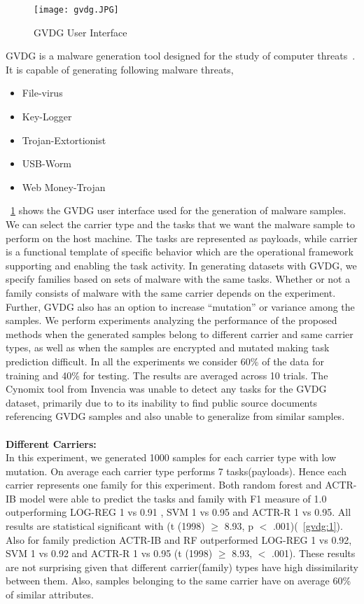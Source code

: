 \documentclass[conference]{IEEEtran}
\begin{document}
\begin{figure}[htb!]
	\centerline{\texttt{[image: gvdg.JPG]}}
	
	\caption{\textmd{GVDG User Interface}}
	
	\label{gvdg}
\end{figure}
\vspace{-2em}
GVDG is a malware generation tool designed for the study of computer threats~\cite{gvdg}. It is capable of generating following malware threats,
\begin{itemize}
	\setlength\itemsep{-0.1em}
	\item File-virus
	\item Key-Logger
	\item Trojan-Extortionist 
	\item USB-Worm
	\item Web Money-Trojan
\end{itemize}



\figurename~\ref{gvdg} shows the GVDG user interface used for the generation of malware samples. We can select the carrier type and the tasks that we want the malware sample to perform on the host machine. The tasks are represented as payloads, while carrier is a functional template of specific behavior which are the operational framework supporting and enabling the task activity. In generating datasets with GVDG, we specify families based on sets of malware with the same tasks.  Whether or not a family consists of malware with the same carrier depends on the experiment.  Further, GVDG also has an option to increase ``mutation'' or variance among the samples. We perform experiments analyzing the performance of the proposed methods when the generated samples belong to different carrier and same carrier types, as well as when the samples are encrypted and mutated making task prediction difficult.  In all the experiments we consider 60\% of the data for training and 40\% for testing. The results are averaged across 10 trials. The Cynomix tool from Invencia was unable to detect any tasks for the GVDG dataset, primarily due to to its inability to find public source documents referencing GVDG samples and also unable to generalize from similar samples.\\\\
{\bf Different Carriers:}\\
In this experiment, we generated 1000 samples for each carrier type with low mutation. On average each carrier type performs 7 tasks(payloads). Hence each carrier represents one family for this experiment. Both random forest and ACTR-IB model were able to predict the tasks and family with F1 measure of 1.0 outperforming LOG-REG 1 vs 0.91 , SVM 1 vs 0.95 and ACTR-R 1 vs 0.95. All results are statistical significant with (t (1998) $\geq$ 8.93, p $<$ .001)(\figurename~\ref{gvdg:1}). Also for family prediction ACTR-IB and RF outperformed LOG-REG 1 vs 0.92, SVM 1 vs 0.92  and ACTR-R 1 vs 0.95 (t (1998) $\geq$ 8.93, $<$ .001).  These results are not surprising given that different carrier(family) types have high dissimilarity between them. Also, samples belonging to the same carrier have on average 60\% of similar attributes.
\end{document}
